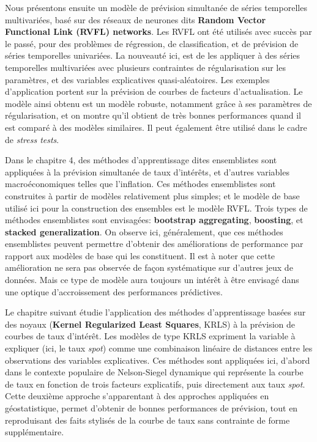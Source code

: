 Nous présentons ensuite un modèle de prévision simultanée de séries temporelles multivariées, basé sur des réseaux de neurones dits \textbf{Random Vector Functional Link (RVFL) networks}. Les RVFL ont été utilisés avec succès par le passé, pour des problèmes de régression, de classification, et de prévision de séries temporelles univariées. La nouveauté ici, est de les appliquer à des séries temporelles multivariées avec plusieurs contraintes de régularisation sur les paramètres, et des variables explicatives quasi-aléatoires. Les exemples d'application portent sur la prévision de courbes de facteurs d'actualisation. Le modèle ainsi obtenu est un modèle robuste, notamment grâce à ses paramètres de régularisation, et on montre qu'il obtient de très bonnes performances quand il est comparé à des modèles similaires. Il peut également être utilisé dans le cadre de \textit{stress tests}. 

Dans le chapitre 4, des méthodes d'apprentissage dites ensemblistes sont appliquées à la prévision simultanée de taux d'intérêts, et d'autres variables macroéconomiques telles que l'inflation. Ces méthodes ensemblistes sont construites à partir de modèles relativement plus simples; et le modèle de base utilisé ici pour la construction des ensembles est le modèle RVFL. Trois types de méthodes ensemblistes sont envisagées: \textbf{bootstrap aggregating},  \textbf{boosting}, et \textbf{stacked generalization}. On observe ici, généralement, que ces méthodes ensemblistes peuvent permettre d'obtenir des améliorations de performance par rapport aux modèles de base qui les constituent. Il est à noter que cette amélioration ne sera pas observée de façon systématique sur d'autres jeux de données. Mais ce type de modèle aura toujours un intérêt à être envisagé dans une optique d'accroissement des performances prédictives. 

Le chapitre suivant étudie l'application des méthodes d'apprentissage basées sur des noyaux (\textbf{Kernel Regularized Least Squares}, KRLS) à la prévision de courbes de taux d'intérêt. Les modèles de type KRLS expriment la variable à expliquer (ici, le taux \textit{spot}) comme une combinaison linéaire de distances entre les observations des variables explicatives. Ces méthodes sont appliquées ici, d'abord dans le contexte populaire de Nelson-Siegel dynamique qui représente la courbe de taux en fonction de trois facteurs explicatifs, puis directement aux taux \textit{spot}. Cette deuxième approche s'apparentant à des approches appliquées en géostatistique, permet d'obtenir de bonnes performances de prévision, tout en reproduisant des faits stylisés de la courbe de taux sans contrainte de forme supplémentaire.

